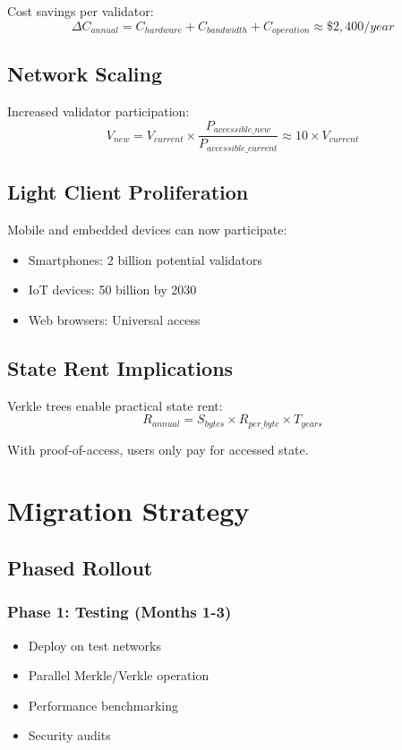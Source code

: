 \documentclass[11pt,a4paper]{article}
\theoremstyle{definition}
\begin{document}
Cost savings per validator:
\begin{equation}
    \Delta C_{annual} = C_{hardware} + C_{bandwidth} + C_{operation} \approx \$2,400/year
\end{equation}

\subsection{Network Scaling}

Increased validator participation:
\begin{equation}
    V_{new} = V_{current} \times \frac{P_{accessible\_new}}{P_{accessible\_current}} \approx 10 \times V_{current}
\end{equation}

\subsection{Light Client Proliferation}

Mobile and embedded devices can now participate:
\begin{itemize}
    \item Smartphones: 2 billion potential validators
    \item IoT devices: 50 billion by 2030
    \item Web browsers: Universal access
\end{itemize}

\subsection{State Rent Implications}

Verkle trees enable practical state rent:
\begin{equation}
    R_{annual} = S_{bytes} \times R_{per\_byte} \times T_{years}
\end{equation}

With proof-of-access, users only pay for accessed state.

\section{Migration Strategy}

\subsection{Phased Rollout}

\subsubsection{Phase 1: Testing (Months 1-3)}
\begin{itemize}
    \item Deploy on test networks
    \item Parallel Merkle/Verkle operation
    \item Performance benchmarking
    \item Security audits
\end{itemize}
\end{document}
